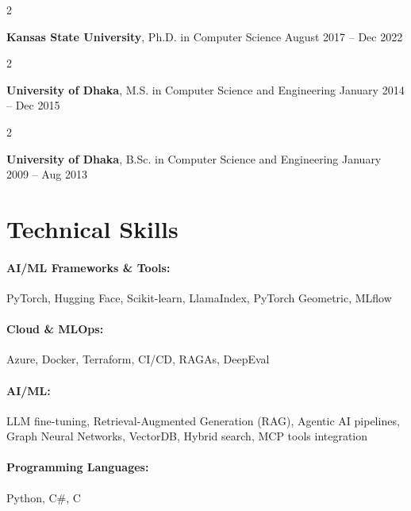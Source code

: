 \documentclass[10pt, letterpaper]{article}
\newenvironment{twocolentry}[2][]{
    \onecolentry
    \def\secondColumn{#2}
    \setcolumnwidth{\fill, 4.5 cm}
    \begin{paracol}{2}
}{
    \switchcolumn \raggedleft \secondColumn
    \end{paracol}
    \endonecolentry
} %
\begin{document}
        \begin{twocolentry}{
            August 2017 -- Dec 2022
        }
            \textbf{Kansas State University}, Ph.D. in Computer Science\end{twocolentry}

        \begin{twocolentry}{
            January 2014 -- Dec 2015
        }
            \textbf{University of Dhaka}, M.S. in Computer Science and Engineering\end{twocolentry}

        \begin{twocolentry}{
            January 2009 -- Aug 2013
        }
            \textbf{University of Dhaka}, B.Sc. in Computer Science and Engineering\end{twocolentry}

\vspace{-1mm}
\section{Technical Skills}

        \paragraph{AI/ML Frameworks \& Tools:} PyTorch, Hugging Face, Scikit-learn, LlamaIndex, PyTorch Geometric, MLflow
        \vspace{-4mm}
        \paragraph{Cloud \& MLOps:} Azure, Docker, Terraform, CI/CD, RAGAs, DeepEval
        \vspace{-4mm}
        \paragraph{AI/ML:} LLM fine-tuning, Retrieval-Augmented Generation (RAG), Agentic AI pipelines, Graph Neural Networks, VectorDB, Hybrid search, MCP tools integration
        \vspace{-4mm}
        \paragraph{Programming Languages:} Python, C\#, C
\end{document}
